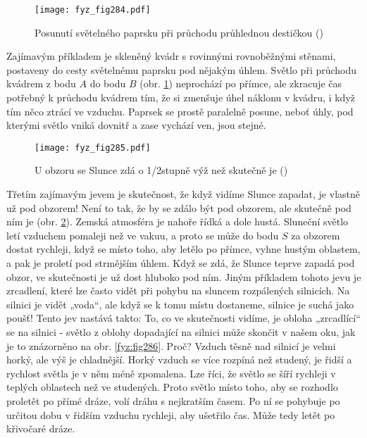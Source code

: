 {    \begin{figure}[ht!] %
      \centering
      \texttt{[image: fyz\_fig284.pdf]}
      \caption{Posunutí světelného paprsku při průchodu průhlednou destičkou
               (\cite[s.~350]{Feynman01})}
      \label{fyz:fig284}
    \end{figure}

    Zajímavým příkladem je skleněný kvádr s rovinnými rovnoběžnými stěnami, postaveny do cesty 
    světelnému paprsku pod nějakým úhlem. Světlo při průchodu kvádrem z bodu \(A\) do bodu \(B\) 
    (obr. \ref{fyz:fig284}) neprochází po přímce, ale zkracuje čas potřebný k průchodu kvádrem tím, 
    že si zmenšuje úhel náklonu v kvádru, i když tím něco ztrácí ve vzduchu. Paprsek se prostě 
    paralelně posune, neboť úhly, pod kterými světlo vniká dovnitř a zase vychází ven, jsou stejné.
    
    \begin{figure}[ht!] %
      \centering
      \texttt{[image: fyz\_fig285.pdf]}
      \caption{U obzoru se Slunce zdá o 1/2stupně výž než skutečně je 
               (\cite[s.~350]{Feynman01})}
      \label{fyz:fig285}
    \end{figure}
    
    Třetím zajímavým jevem je skutečnost, že když vidíme Slunce zapadat, je vlastně už pod obzorem! 
    Není to tak, že by se zdálo být pod obzorem, ale skutečně pod ním je (obr. \ref{fyz:fig285}). 
    Zemská atmosféra je nahoře řídká a dole hustá. Sluneční světlo letí vzduchem pomaleji než ve 
    vakuu, a proto se může do bodu \(S\) za obzorem dostat rychleji, když se místo toho, aby letělo 
    po přímce, vyhne hustým oblastem, a pak je proletí pod strmějším úhlem. Když se zdá, že Slunce 
    teprve zapadá pod obzor, ve skutečnosti je už dost hluboko pod ním. Jiným příkladem tohoto jevu 
    je zrcadlení, které lze často vidět při pohybu na sluncem rozpálených silnicích. Na silnici je 
    vidět „voda“, ale když se k tomu místu dostaneme, silnice je suchá jako poušť! Tento jev 
    nastává takto: To, co ve skutečnosti vidíme, je obloha „zrcadlící“ se na silnici - světlo z 
    oblohy dopadající na silnici může skončit v našem oku, jak je to znázorněno na obr. 
    \ref{fyz:fig286}. Proč? Vzduch těsně nad silnicí je velmi horký, ale výš je chladnější. Horký 
    vzduch se více rozpíná než studený, je řidší a rychlost světla je v něm méně zpomalena. Lze 
    říci, že světlo se šíří rychleji v teplých oblastech než ve studených. Proto světlo místo toho, 
    aby se rozhodlo proletět po přímé dráze, volí dráhu s nejkratším časem. Po ní se pohybuje po 
    určitou dobu v řidším vzduchu rychleji, aby ušetřilo čas. Může tedy letět po křivočaré dráze.
    
}
